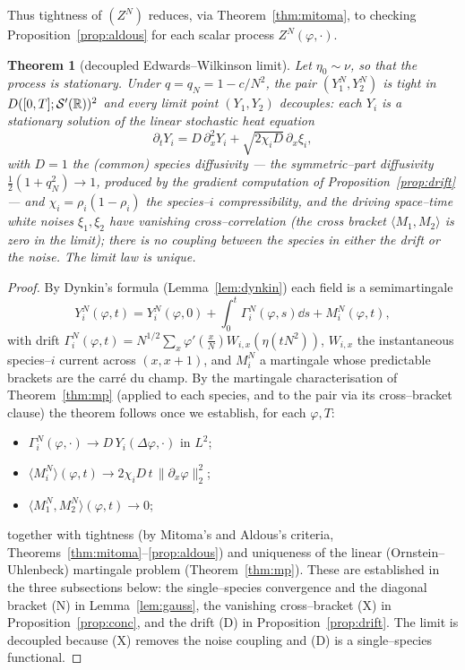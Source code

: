 \documentclass[11pt]{article}
\theoremstyle{plain}
\newtheorem{theorem}{Theorem}[section]
\theoremstyle{definition}
\theoremstyle{remark}
\begin{document}
\noindent Thus tightness of $(Z^N)$ reduces, via Theorem~\ref{thm:mitoma}, to checking
Proposition~\ref{prop:aldous} for each scalar process $Z^N(\varphi,\cdot)$.

\begin{theorem}[decoupled Edwards--Wilkinson limit]\label{thm:ewmain}
Let $\eta_0\sim\nu$, so that the process is stationary. Under $q=q_N=1-c/N^2$, the
pair $(Y_1^N,Y_2^N)$ is tight in
$D([0,T];\mathcal S'(\mathbb{R}))^2$ and every limit point $(Y_1,Y_2)$ \emph{decouples}: each $Y_i$ is
a stationary solution of the linear stochastic heat equation
\[
  \partial_t Y_i=D\,\partial_x^2 Y_i+\sqrt{2\chi_i D}\,\partial_x\xi_i,
\]
with $D=1$ the (common) species diffusivity --- the symmetric--part diffusivity
$\tfrac12(1+q_N^2)\to1$, produced by the gradient computation of
Proposition~\ref{prop:drift} --- and $\chi_i=\rho_i(1-\rho_i)$ the
species--$i$ compressibility,
and the driving space--time white noises $\xi_1,\xi_2$ have \emph{vanishing
cross--correlation} (the cross bracket $\langle M_1,M_2\rangle$ is zero in the limit);
there is no coupling between the species in either the drift or the noise. The limit
law is unique.
\end{theorem}

\begin{proof}
By Dynkin's formula (Lemma~\ref{lem:dynkin}) each field is a semimartingale
\begin{equation}\label{eq:dynkin}
  Y_i^N(\varphi,t)=Y_i^N(\varphi,0)+\int_0^t\Gamma_i^N(\varphi,s)\dd s+M_i^N(\varphi,t),
\end{equation}
with drift $\Gamma_i^N(\varphi,t)=N^{1/2}\sum_x\varphi'(\tfrac xN)W_{i,x}(\eta(tN^2))$,
$W_{i,x}$ the instantaneous species--$i$ current across $(x,x{+}1)$, and $M_i^N$ a
martingale whose predictable brackets are the carr\'e du champ. By the martingale
characterisation of Theorem~\ref{thm:mp} (applied to each species, and to the pair via
its cross--bracket clause) the theorem follows once we establish, for each $\varphi,T$:
\begin{itemize}
\item[\textup{(D)}] $\Gamma_i^N(\varphi,\cdot)\to D\,Y_i(\Delta\varphi,\cdot)$ in $L^2$;
\item[\textup{(N)}] $\langle M_i^N\rangle(\varphi,t)\to 2\chi_i D\,t\,\|\partial_x\varphi\|_2^2$;
\item[\textup{(X)}] $\langle M_1^N,M_2^N\rangle(\varphi,t)\to0$;
\end{itemize}
together with tightness (by Mitoma's and Aldous's criteria,
Theorems~\ref{thm:mitoma}--\ref{prop:aldous}) and uniqueness of the linear
(Ornstein--Uhlenbeck) martingale problem (Theorem~\ref{thm:mp}). These
are established in the three subsections below: the single--species convergence and the
diagonal bracket (N) in Lemma~\ref{lem:gauss}, the vanishing cross--bracket (X) in
Proposition~\ref{prop:conc}, and the drift (D) in Proposition~\ref{prop:drift}. The
limit is decoupled because (X) removes the noise coupling and (D) is a single--species
functional.
\end{proof}
\end{document}
